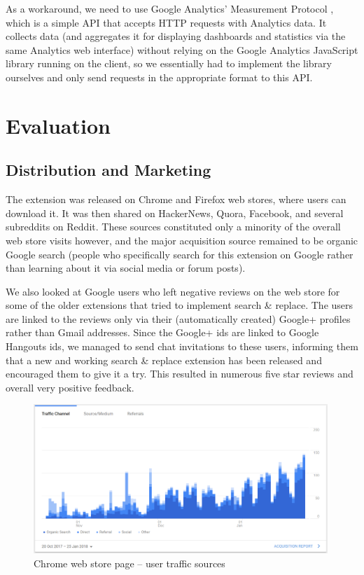 \documentclass[bsc,frontabs,twoside,singlespacing,parskip,deptreport]{infthesis}
\begin{document}
As a workaround, we need to use Google Analytics' Measurement Protocol \cite{A21}, which is a simple API that accepts HTTP requests with Analytics data. It collects data (and aggregates it for displaying dashboards and statistics via the same Analytics web interface) without relying on the Google Analytics JavaScript library running on the client, so we essentially had to implement the library ourselves and only send requests in the appropriate format to this API.

\chapter{Evaluation}
\section{Distribution and Marketing}
The extension was released on Chrome and Firefox web stores, where users can download it. It was then shared on HackerNews, Quora, Facebook, and several subreddits on Reddit. These sources constituted only a minority of the overall web store visits however, and the major acquisition source remained to be organic Google search (people who specifically search for this extension on Google rather than learning about it via social media or forum posts).

We also looked at Google users who left negative reviews on the web store for some of the older extensions that tried to implement search \& replace. The users are linked to the reviews only via their (automatically created) Google+ profiles rather than Gmail addresses. Since the Google+ ids are linked to Google Hangouts ids, we managed to send chat invitations to these users, informing them that a new and working search \& replace extension has been released and encouraged them to give it a try. This resulted in numerous five star reviews and overall very positive feedback.

\begin{figure}[h]
\centering
\includegraphics[width=0.99\textwidth]{../docs/user-acquisition.png}
\caption{Chrome web store page -- user traffic sources}
\end{figure}
\end{document}

